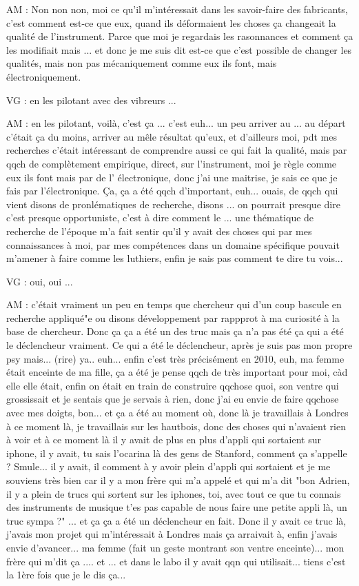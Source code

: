 AM : Non non non, moi ce qu'il m'intéressait dans les savoir-faire des fabricants, c'est comment  est-ce que eux, quand ils déformaient les choses ça changeait la qualité de l'instrument. Parce que moi je regardais les rasonnances et comment ça les modifiait mais ... et donc je me suis dit est-ce que c'est possible de changer les qualités, mais non pas mécaniquement comme eux ils font, mais électroniquement.

VG : en les pilotant avec des vibreurs ...

AM : en les pilotant, voilà, c'est ça ... c'est euh... un peu arriver au ... au départ c'était ça du moins, arriver au mêle résultat qu'eux, et d'ailleurs moi, pdt mes recherches c'était intéressant de comprendre aussi ce qui fait la qualité, mais par qqch de complètement empirique, direct, sur l'instrument, moi je règle comme eux ils font mais par de l' électronique, donc j'ai une maitrise, je sais ce que je fais par l'électronique.
Ça, ça a été qqch d'important, euh... ouais, de qqch qui vient disons de pronlématiques de recherche, disons ... on pourrait presque dire c'est presque opportuniste, c'est à dire comment le ... une thématique de recherche de l'époque m'a fait sentir qu'il y avait des choses qui par mes connaissances à moi, par mes compétences dans un domaine spécifique pouvait m'amener à faire comme les luthiers, enfin je sais pas comment te dire tu vois...

VG  : oui, oui ...

AM : c'était vraiment un peu en temps que chercheur qui d'un coup bascule en recherche appliqué"e ou disons développement par rappprot à ma curiosité à la base de chercheur. Donc ça ça a été un des truc mais ça n'a pas été ça qui a été le déclencheur vraiment.
Ce qui a été le déclencheur, après je suis pas mon propre psy mais... (rire) ya.. euh... enfin c'est très précisément en 2010, euh, ma femme était enceinte de ma fille, ça a été  je pense  qqch de très important pour moi, càd elle elle était, enfin on était en train de construire qqchose quoi, son ventre qui grossissait et je sentais que je servais à rien, donc j'ai eu envie de faire qqchose avec mes doigts, bon...
et ça a été au moment où, donc là je travaillais à Londres à ce moment là, je travaillais sur les hautbois, donc des choses qui n'avaient rien à voir et à ce moment là il y avait de plus en plus d'appli qui sortaient sur iphone, il y avait, tu sais l'ocarina là des gens de Stanford, comment ça s'appelle ? Smule... il y avait, il comment à y avoir plein d'appli qui sortaient et je me souviens très bien car il y a mon frère qui m'a appelé et qui m'a dit "bon Adrien, il y a plein de trucs qui sortent sur les iphones, toi, avec tout ce que tu connais des instruments de musique t'es pas capable de nous faire une petite appli là, un truc sympa ?" ... et ça ça a été un déclencheur en fait.
Donc il y avait ce truc là, j'avais mon projet qui m'intéressait à Londres mais ça arraivait à, enfin j'avais envie d'avancer... ma femme (fait un geste montrant son ventre enceinte)... mon frère qui m'dit ça .... et ... et dans le labo il y avait qqn qui utilisait... tiens c'est la 1ère fois que je le dis ça...

